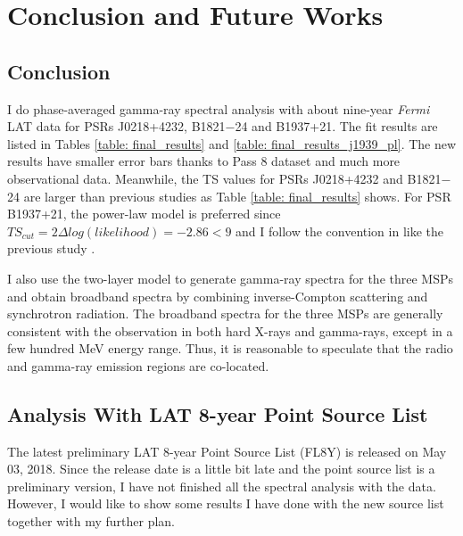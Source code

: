 \documentclass[a4paper, 12pt]{report}
\begin{document}
\chapter{Conclusion and Future Works}
  \section{Conclusion}
    I do phase-averaged gamma-ray spectral analysis with about nine-year \textit{Fermi} LAT
    data for PSRs J0218+4232, B1821$-$24 and B1937+21. The fit results are listed in Tables 
    \ref{table: final_results} and \ref{table: final_results_j1939_pl}. The new results 
    have smaller error bars thanks to Pass 8 dataset and much more observational data.
    Meanwhile, the TS values for PSRs J0218+4232 and B1821$-$24 are larger than previous 
    studies as Table \ref{table: final_results} shows. For PSR B1937+21, the power-law 
    model is preferred since $TS_{cut} = 2\Delta log(likelihood) = -2.86 < 9$ and I follow 
    the convention in \cite{0067-0049-208-2-17} like the previous study
    \cite{0004-637X-787-2-167}.

    I also use the two-layer model to generate gamma-ray spectra for the three MSPs and obtain 
    broadband spectra by combining inverse-Compton scattering and synchrotron radiation.
    The broadband spectra for the three MSPs are generally consistent with the observation 
    in both hard X-rays and gamma-rays, except in a few hundred MeV energy range. Thus, it 
    is reasonable to speculate that the radio and gamma-ray emission regions are co-located. 

  \section{Analysis With LAT 8-year Point Source List}
    The latest preliminary LAT 8-year Point Source List (FL8Y) is released 
    on May 03, 2018. Since the release date is a little bit late and the point source list 
    is a preliminary version, I have not finished all the spectral analysis with the data.
    However, I would like to show some results I have done with the new source list
    together with my further plan.
\end{document}
